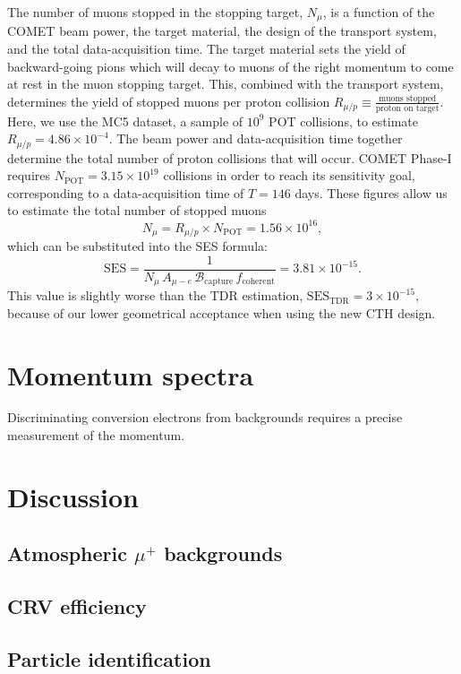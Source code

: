 The number of muons stopped in the stopping target, $N_\mu$, is a function of
the COMET beam power, the target material, the design of the
transport system, and the total data-acquisition time. 
The target material sets the yield of
backward-going pions which will decay to muons of the right momentum to come at
rest in the muon stopping target. This, combined with the transport system,
determines the yield of stopped muons per proton collision $R_{\mu/p} \equiv
\frac{\text{muons stopped}}{\text{proton on target}}$. Here, we use the
MC5 dataset, a sample of $10^9$ POT collisions, to estimate $R_{\mu/p}=4.86
\times 10^{-4}$.
The beam power and data-acquisition time together determine the total number of proton
collisions that will occur. COMET Phase-I requires $N_\mathrm{POT} = 3.15 \times
10^{19}$ collisions in order to reach its sensitivity goal, corresponding to a
data-acquisition time of $T=146$ days.
These figures allow us to estimate the total number of stopped muons
$$N_\mu = R_{\mu/p} \times N_\mathrm{POT} = 1.56\times 10^{16},$$
which can be substituted into the SES formula:
\begin{equation}\label{eq:my_ses}
\mathrm{SES}
=\frac{1}{N_\mu\,A_{\mu-e}\,\mathcal{B}_\mathrm{capture}\,f_\mathrm{coherent}}
= 3.81\times10^{-15}.
\end{equation}
This value is slightly worse than the TDR estimation,
$\mathrm{SES}_\mathrm{TDR}=3\times 10^{-15}$, because of our lower geometrical
acceptance when using the new CTH design.



\section{Momentum spectra}
Discriminating conversion electrons from backgrounds requires a precise
measurement of the momentum. 

\section{Discussion}

\subsection{Atmospheric $\mu^+$ backgrounds}

\subsection{CRV efficiency}

\subsection{Particle identification}
